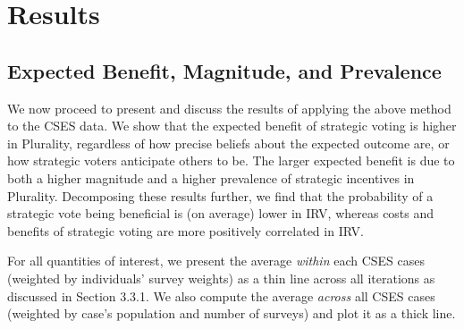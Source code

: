 \documentclass[11pt, letter]{article}
\begin{document}

\section{Results}

\subsection{Expected Benefit, Magnitude, and Prevalence}

We now proceed to present and discuss the results of applying the above method to the CSES data. We show that the expected benefit of strategic voting is higher in Plurality, regardless of how precise beliefs about the expected outcome are, or how strategic voters anticipate others to be. The larger expected benefit is due to both a higher magnitude and a higher prevalence of strategic incentives in Plurality. Decomposing these results further, we find that the probability of a strategic vote being beneficial is (on average) lower in IRV, whereas costs and benefits of strategic voting are more positively correlated in IRV.

For all quantities of interest, we present the average \emph{within} each CSES cases (weighted by individuals' survey weights) as a thin line across all iterations as discussed in Section 3.3.1. We also compute the average \emph{across} all CSES cases (weighted by case's population and number of surveys) and plot it as a thick line.
\end{document}
